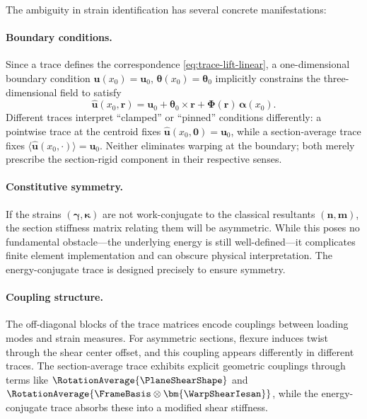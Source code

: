 The ambiguity in strain identification has several concrete manifestations:

\paragraph{Boundary conditions.}
Since a trace defines the correspondence \eqref{eq:trace-lift-linear}, a one-dimensional 
boundary condition $\bm{u}(x_0) = \bm{u}_0$, $\bm{\theta}(x_0) = \bm{\theta}_0$ 
implicitly constrains the three-dimensional field to satisfy
\begin{equation}
\hat{\bm{u}}(x_0, \bm{r}) = \bm{u}_0 + \bm{\theta}_0 \times \bm{r} 
+ \bm{\Phi}(\bm{r})\,\bm{\alpha}(x_0).
\label{eq:bc-3d}
\end{equation}
Different traces interpret ``clamped'' or ``pinned'' conditions differently: 
a pointwise trace at the centroid fixes $\hat{\bm{u}}(x_0, \mathbf{0}) = \bm{u}_0$, 
while a section-average trace fixes $\langle\hat{\bm{u}}(x_0, \cdot)\rangle = \bm{u}_0$. 
Neither eliminates warping at the boundary; both merely prescribe the section-rigid component in their respective senses.

\paragraph{Constitutive symmetry.}
If the strains $(\bm{\gamma}, \bm{\kappa})$ are not work-conjugate to the 
classical resultants $(\bm{n}, \bm{m})$, the section stiffness matrix relating 
them will be asymmetric. 
While this poses no fundamental obstacle---the 
underlying energy is still well-defined---it complicates finite element 
implementation and can obscure physical interpretation. The energy-conjugate trace is designed precisely to ensure symmetry.

\paragraph{Coupling structure.}
The off-diagonal blocks of the trace matrices encode couplings between 
loading modes and strain measures. For asymmetric sections, flexure induces 
twist through the shear center offset, and this coupling appears differently 
in different traces. The section-average trace exhibits explicit geometric 
couplings through terms like $\RotationAverage{\PlaneShearShape}$ and 
$\RotationAverage{\FrameBasis \otimes \bm{\WarpShearIesan}}$, while the 
energy-conjugate trace absorbs these into a modified shear stiffness.


